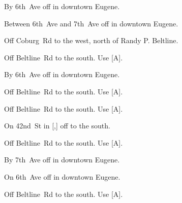 

\begin{LocationList}

By 6th~Ave off  in downtown Eugene.

Between 6th~Ave and  7th~Ave off  in downtown Eugene.

Off Coburg~Rd to the west, north of  Randy P. Beltline.

Off Beltline~Rd to the south.
Use  [A].

By 6th~Ave off  in downtown Eugene.

\Location{\GasStation \Gas}
Off Beltline~Rd to the south.
Use  [A].

\Location{\GarageHQ \Garage}
Off Beltline~Rd to the south.
Use  [A].

On 42nd~St in [,] off   to the south.

\Location{\RecruitmentAgency \Recruitment}
Off Beltline~Rd to the south.
Use  [A].

By  7th~Ave off  in downtown Eugene.

On 6th~Ave off  in downtown Eugene.

Off Beltline~Rd to the south.
Use  [A].

\end{LocationList}
